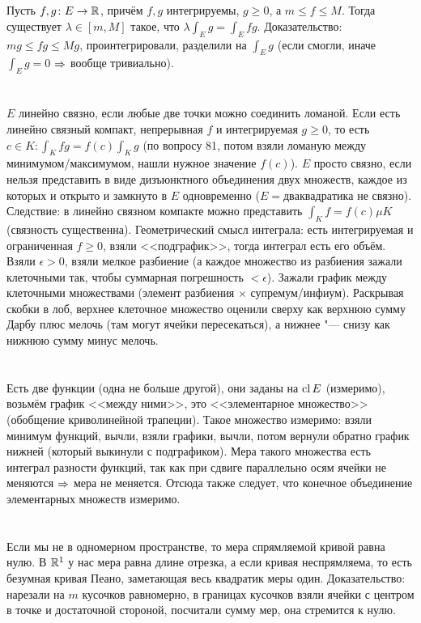 \section{} %
Пусть $f, g \colon E \to \mathbb{R}$, причём $f, g$ интегрируемы, $g \ge 0$, а $m \le f \le M$.
Тогда существует $\lambda \in [m, M]$ такое, что $\lambda \int_E g = \int_E fg$.
Доказательство: $mg \le fg \le Mg$, проинтегрировали, разделили на $\int_E g$ (если смогли, иначе $\int_E g = 0$ $\Rightarrow$ вообще тривиально).

\section{} %
$E$ линейно связно, если любые две точки можно соединить ломаной.
Если есть линейно связный компакт, непрерывная $f$ и интегрируемая $g \ge 0$, то есть $c \in K \colon \int_K fg = f(c) \int_K g$ (по вопросу 81, потом взяли ломаную между минимумом/максимумом, нашли нужное значение $f(c)$).
$E$ просто связно, если нельзя представить в виде дизъюнктного объединения двух множеств, каждое из которых и открыто и замкнуто в $E$ одновременно ($E=два квадратика$ не связно).
Следствие: в линейно связном компакте можно представить $\int_K f = f(c) \mu K$ (связность существенна).
Геометрический смысл интеграла: есть интегрируемая и ограниченная $f \ge 0$, взяли <<подграфик>>, тогда интеграл есть его объём.
Взяли $\epsilon > 0$, взяли мелкое разбиение (а каждое множество из разбиения зажали клеточными так, чтобы суммарная погрешность $< \epsilon$).
Зажали график между клеточными множествами (элемент разбиения $\times$ супремум/инфиум).
Раскрывая скобки в лоб, верхнее клеточное множество оценили сверху как верхнюю сумму Дарбу плюс мелочь (там могут ячейки пересекаться), а нижнее "--- снизу как нижнюю сумму минус мелочь.

\section{} %
Есть две функции (одна не больше другой), они заданы на $\operatorname{cl} E$ (измеримо), возьмём график <<между ними>>, это <<элементарное множество>> (обобщение криволинейной трапеции).
Такое множество измеримо: взяли минимум функций, вычли, взяли графики, вычли, потом вернули обратно график нижней (который выкинули с подграфиком).
Мера такого множества есть интеграл разности функций, так как при сдвиге параллельно осям ячейки не меняются $\Rightarrow$ мера не меняется.
Отсюда также следует, что конечное объединение элементарных множеств измеримо.

\section{} %
Если мы не в одномерном пространстве, то мера спрямляемой кривой равна нулю.
В $\mathbb{R}^1$ у нас мера равна длине отрезка, а если кривая неспрямляема, то есть безумная кривая Пеано, заметающая весь квадратик меры один.
Доказательство: нарезали на $m$ кусочков равномерно, в границах кусочков взяли ячейки с центром в точке и достаточной стороной, посчитали сумму мер, она стремится к нулю.
